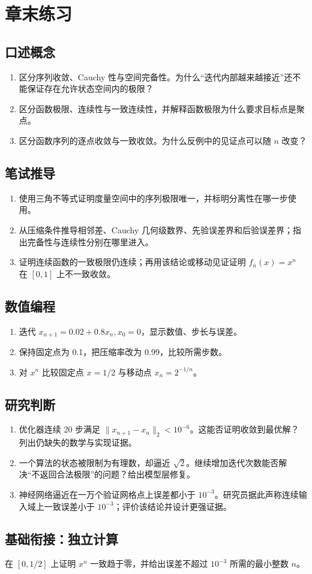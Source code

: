 \section*{章末练习}
\begingroup\small
\subsection*{口述概念}
\begin{enumerate}[nosep,leftmargin=*]
  \item 区分序列收敛、Cauchy 性与空间完备性。为什么“迭代内部越来越接近”还不能保证存在允许状态空间内的极限？
  \item 区分函数极限、连续性与一致连续性，并解释函数极限为什么要求目标点是聚点。
  \item 区分函数序列的逐点收敛与一致收敛。为什么反例中的见证点可以随 $n$ 改变？
\end{enumerate}

\subsection*{笔试推导}
\begin{enumerate}[nosep,leftmargin=*]
  \item 使用三角不等式证明度量空间中的序列极限唯一，并标明分离性在哪一步使用。
  \item 从压缩条件推导相邻差、Cauchy 几何级数界、先验误差界和后验误差界；指出完备性与连续性分别在哪里进入。
  \item 证明连续函数的一致极限仍连续；再用该结论或移动见证证明 $f_n(x)=x^n$ 在 $[0,1]$ 上不一致收敛。
\end{enumerate}

\subsection*{数值编程}
\begin{enumerate}[leftmargin=*]
  \item 迭代 $x_{n+1}=0.02+0.8x_n,x_0=0$，显示数值、步长与误差。
  \item 保持固定点为 0.1，把压缩率改为 0.99，比较所需步数。
  \item 对 $x^n$ 比较固定点 $x=1/2$ 与移动点 $x_n=2^{-1/n}$。
\end{enumerate}

\subsection*{研究判断}
\begin{enumerate}[nosep,leftmargin=*]
  \item 优化器连续 20 步满足 $\lVert x_{n+1}-x_n\rVert_2<10^{-6}$。这能否证明收敛到最优解？列出仍缺失的数学与实现证据。
  \item 一个算法的状态被限制为有理数，却逼近 $\sqrt2$。继续增加迭代次数能否解决“不返回合法极限”的问题？给出模型层修复。
  \item 神经网络逼近在一万个验证网格点上误差都小于 $10^{-3}$。研究员据此声称连续输入域上一致误差小于 $10^{-3}$；评价该结论并设计更强证据。
\end{enumerate}
\endgroup

\subsection*{基础衔接：独立计算}
在 $[0,1/2]$ 上证明 $x^n$ 一致趋于零，并给出误差不超过 $10^{-3}$ 所需的最小整数 $n$。
